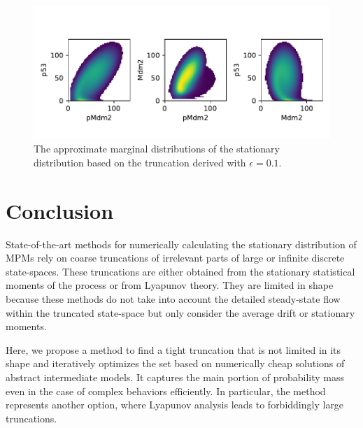 \begin{figure}[htb]
  \includegraphics[width=.9\textwidth]{gfx/p53_dist.pdf}
  \caption[approximate marginal distributions of the p53 stationary
  distribution]{The approximate marginal distributions of the
  stationary distribution based on the truncation derived with $\epsilon=0.1$.}
  \label{fig:p53:dist}
\end{figure}

\section{Conclusion}
State-of-the-art methods for numerically calculating the stationary
distribution of \aclp{MPM} rely on coarse truncations of irrelevant
parts of large or infinite discrete state-spaces.
These truncations are either obtained from the stationary statistical
moments of the process or from
Lyapunov theory. They are limited in shape because these methods do
not take into account the detailed
steady-state flow within the truncated state-space but only consider
the average drift or stationary moments.

Here, we propose a method to find a tight truncation
that is not limited in its shape and iteratively optimizes the set
based on numerically cheap solutions
of abstract intermediate models.
It   captures the main portion of probability mass even in the case
of complex behaviors efficiently.
In particular, the method represents another option, where Lyapunov
analysis leads to forbiddingly large truncations.
